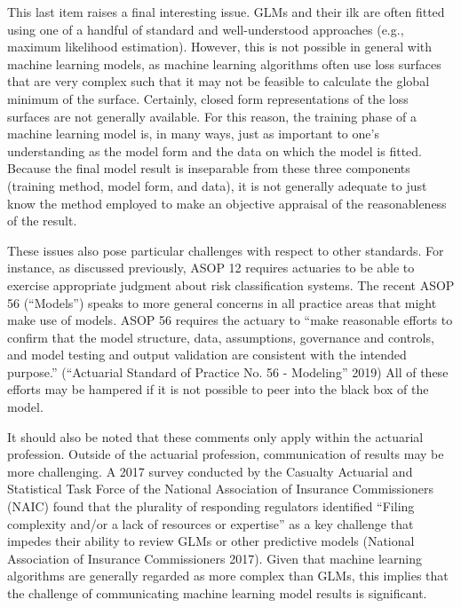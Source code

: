 \documentclass[preprint, 3p, twocolumn, letterpaper, 10pt]{elsarticle} %
\begin{document}
This last item raises a final interesting issue. GLMs and their ilk are often
fitted using one of a handful of standard and well-understood approaches (e.g.,
maximum likelihood estimation). However, this is not possible in general with
machine learning models, as machine learning algorithms often use loss surfaces
that are very complex such that it may not be feasible to calculate the global
minimum of the surface. Certainly, closed form representations of the loss
surfaces are not generally available. For this reason, the training phase of a
machine learning model is, in many ways, just as important to one's
understanding as the model form and the data on which the model is fitted.
Because the final model result is inseparable from these three components
(training method, model form, and data), it is not generally adequate to just
know the method employed to make an objective appraisal of the reasonableness
of the result.

These issues also pose particular challenges with respect to other standards.
For instance, as discussed previously, ASOP 12 requires
actuaries to be able to exercise appropriate judgment about risk classification
systems. The recent ASOP 56 (``Models'') speaks to more general concerns in all
practice areas that might make use of models. ASOP 56 requires the actuary to
``make reasonable efforts to confirm that the model structure, data, assumptions,
governance and controls, and model testing and output validation are consistent
with the intended purpose.'' (``Actuarial Standard of Practice No. 56 - Modeling'' 2019) All of these efforts may be hampered if
it is not possible to peer into the black box of the model.

It should also be noted that these comments only apply within the actuarial profession. Outside of
the actuarial profession, communication of results may be more challenging. A
2017 survey conducted by the Casualty Actuarial and Statistical Task Force of
the National Association of Insurance Commissioners (NAIC) found that the plurality of
responding regulators identified ``Filing complexity and/or a lack of resources
or expertise'' as a key challenge that impedes their ability to review GLMs or
other predictive models (National Association of Insurance Commissioners 2017). Given that machine learning
algorithms are generally regarded as more complex than GLMs, this implies that
the challenge of communicating machine learning model results is significant.
\end{document}
